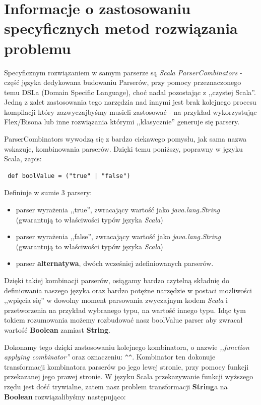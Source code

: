 \documentclass[a4paper]{article}
\begin{document}
\newpage
\section{Informacje o zastosowaniu specyficznych metod rozwiązania problemu}
Specyficznym rozwiązaniem w samym parserze są \textit{Scala ParserCombinators} - część języka dedykowana budowaniu Parserów, przy pomocy przeznaczonego
temu DSLa (Domain Specific Language), choć nadal pozostając z ,,czystej Scala''. Jedną z zalet zastosowania tego narzędzia nad innymi jest 
brak kolejnego procesu kompilacji który zazwyczajbyśmy musieli zastosować - na przykład wykorzystując Flex/Bisona lub inne rozwiązania którymi
,,klasycznie'' generuje się parsery. 

ParserCombinators wywodzą się z bardzo ciekawego pomysłu, jak sama nazwa wskazuje, kombinowania parserów. Dzięki temu poniższy, poprawny w języku Scala,
zapis: 

\begin{verbatim}
 def boolValue = ("true" | "false")
\end{verbatim}

Definiuje w sumie 3 parsery:
\begin{itemize}
 \item parser wyrażenia ,,true'', zwracający wartość jako \textit{java.lang.String} (gwarantują to właściwości typów języka \textit{Scala})
 \item parser wyrażenia ,,false'', zwracający wartość jako \textit{java.lang.String} (gwarantują to właściwości typów języka \textit{Scala})
 \item parser \textbf{alternatywa}, dwóch wcześniej zdefiniowanych parserów. 
\end{itemize}
Dzięki takiej kombinacji parserów, osiągamy bardzo czytelną składnię do definiowania naszego języka oraz bardzo potężne narzędzie w postaci 
możliwości ,,wpięcia się'' w dowolny moment parsowania zwyczajnym kodem \textit{Scala} i przetworzenia na przykład wybranego typu, na wartość
innego typu. Idąc tym tokiem rozumowania możemy rozbudować nasz boolValue parser aby zwracał wartość \textbf{Boolean} zamiast \textbf{String}.

Dokonamy tego dzięki zastosowaniu kolejnego kombinatora, o nazwie \textit{,,function applying combinator''} oraz oznaczeniu: \verb|^^|.
Kombinator ten dokonuje transformacji kombinatora parserów po jego lewej stronie, przy pomocy funkcji przekazanej jego prawej stronie.
W języku Scala przekazywanie funkcji wyższego rzędu jest dość trywialne, zatem nasz problem transformacji \textbf{String}a na \textbf{Boolean} 
rozwiązalibyśmy następująco:
\end{document}
